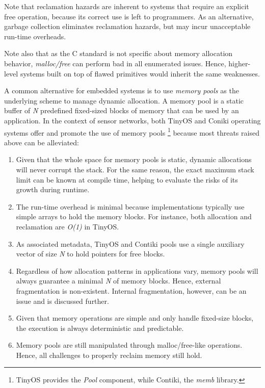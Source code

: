 \documentclass{sig-alternate-ipsn13}
\begin{document}
Note that reclamation hazards are inherent to systems that require an explicit 
free operation, because its correct use is left to programmers.
As an alternative, garbage collection eliminates reclamation hazards, but may 
incur unacceptable run-time overheads.

Note also that as the C standard is not specific about memory allocation 
behavior, \emph{malloc/free} can perform bad in all enumerated issues.
%
Hence, higher-level systems built on top of flawed primitives would inherit the 
same weaknesses.

A common alternative for embedded systems is to use \emph{memory pools} as the 
underlying scheme to manage dynamic allocation.
A memory pool is a static buffer of \emph{N} predefined fixed-sized blocks of 
memory that can be used by an application.
%
In the context of sensor networks, both TinyOS and Coniki operating systems 
offer and promote the use of memory pools%
\footnote{
TinyOS provides the \emph{Pool} component, while Contiki, the \emph{memb} 
library.
}
because most threats raised above can be alleviated:

\begin{enumerate}
\item
Given that the whole space for memory pools is static, dynamic allocations will 
never corrupt the stack.
For the same reason, the exact maximum stack limit can be known at compile 
time, helping to evaluate the risks of its growth during runtime.

\item
The run-time overhead is minimal because implementations typically use simple 
arrays to hold the memory blocks.
For instance, both allocation and reclamation are \emph{O(1)} in TinyOS.

\item
As associated metadata, TinyOS and Contiki pools use a single auxiliary vector 
of size \emph{N} to hold pointers for free blocks.

\item
Regardless of how allocation patterns in applications vary, memory pools will 
always guarantee a minimal \emph{N} of memory blocks.
Hence, external fragmentation is non-existent.
Internal fragmentation, however, can be an issue and is discussed further.

\item
Given that memory operations are simple and only handle fixed-size blocks, the 
execution is always deterministic and predictable.

\item
Memory pools are still manipulated through malloc/free-like operations.
Hence, all challenges to properly reclaim memory still hold.
\end{enumerate}
\end{document}
